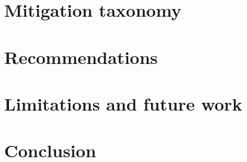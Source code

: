 \documentclass[11pt,letterpaper]{article}
\begin{document}
\section{Mitigation taxonomy}\label{sec:mitigation}


\section{Recommendations}\label{sec:recommendations}


\section{Limitations and future work}\label{sec:future}


\section{Conclusion}\label{sec:conclusion}


\printbibliography
\end{document}

